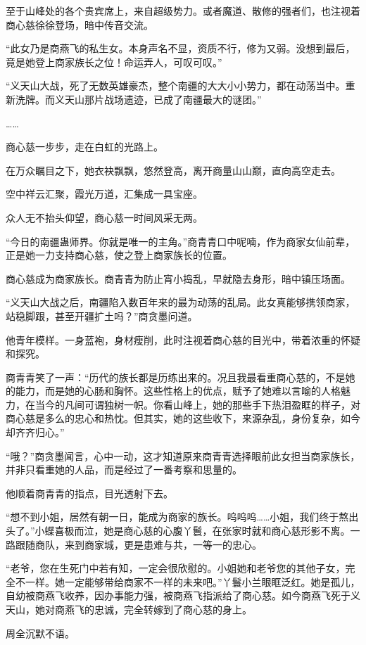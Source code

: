 \begin{this_body}
至于山峰处的各个贵宾席上，来自超级势力。或者魔道、散修的强者们，也注视着商心慈徐徐登场，暗中传音交流。

“此女乃是商燕飞的私生女。本身声名不显，资质不行，修为又弱。没想到最后，竟是她登上商家族长之位！命运弄人，可叹可叹。”

“义天山大战，死了无数英雄豪杰，整个南疆的大大小小势力，都在动荡当中。重新洗牌。而义天山那片战场遗迹，已成了南疆最大的谜团。”

……

商心慈一步步，走在白虹的光路上。

在万众瞩目之下，她衣袂飘飘，悠然登高，离开商量山山巅，直向高空走去。

空中祥云汇聚，霞光万道，汇集成一具宝座。

众人无不抬头仰望，商心慈一时间风采无两。

“今日的南疆蛊师界。你就是唯一的主角。”商青青口中呢喃，作为商家女仙前辈，正是她一力支持商心慈，使之登上商家族长的位置。

商心慈成为商家族长。商青青为防止宵小捣乱，早就隐去身形，暗中镇压场面。

“义天山大战之后，南疆陷入数百年来的最为动荡的乱局。此女真能够携领商家，站稳脚跟，甚至开疆扩土吗？”商贪墨问道。

他青年模样。一身蓝袍，身材瘦削，此时注视着商心慈的目光中，带着浓重的怀疑和探究。

商青青笑了一声：“历代的族长都是历练出来的。况且我最看重商心慈的，不是她的能力，而是她的心肠和胸怀。这些性格上的优点，赋予了她难以言喻的人格魅力，在当今的凡间可谓独树一帜。你看山峰上，她的那些手下热泪盈眶的样子，对商心慈是多么的忠心和热忱。但其实，她的这些收下，来源杂乱，身份复杂，如今却齐齐归心。”

“哦？”商贪墨闻言，心中一动，这才知道原来商青青选择眼前此女担当商家族长，并非只看重她的人品，而是经过了一番考察和思量的。

他顺着商青青的指点，目光透射下去。

“想不到小姐，居然有朝一日，能成为商家的族长。呜呜呜……小姐，我们终于熬出头了。”小蝶喜极而泣，她是商心慈的心腹丫鬟，在张家时就和商心慈形影不离。一路跟随商队，来到商家城，更是患难与共，一等一的忠心。

“老爷，您在生死门中若有知，一定会很欣慰的。小姐她和老爷您的其他子女，完全不一样。她一定能够带给商家不一样的未来吧。”丫鬟小兰眼眶泛红。她是孤儿，自幼被商燕飞收养，因办事能力强，被商燕飞指派给了商心慈。如今商燕飞死于义天山，她对商燕飞的忠诚，完全转嫁到了商心慈的身上。

周全沉默不语。


\end{this_body}
